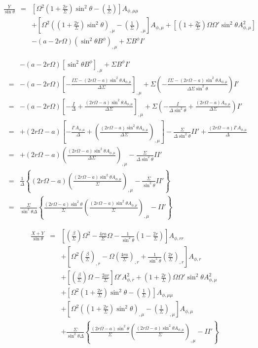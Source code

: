 \documentclass[aps,prd,preprint,groupedaddress]{revtex4-1}
\def\nn{\nonumber}
\def\beqn{\begin{eqnarray}}
\def\eeqn{\end{eqnarray}}
\def\st{\sin\theta}
\def\sst{\sin^2\theta}
\def\Ar{A_{\phi,r}}
\def\Arr{A_{\phi,rr}}
\def\Am{A_{\phi,\mu}}
\def\Amm{A_{\phi,\mu\mu}}
\begin{document}
\beqn
\frac{Y}{\st}
&=&
\left[\Omega^2\left(1+\frac{2r}{\Sigma}\right)\sst-\left(\frac{1}{\Sigma}\right) \right]\Amm\nn\\
&&
+\left[ \Omega^2\left( (1+\frac{2r}{\Sigma})\sst \right)_{,\mu}-\left(\frac{1}{\Sigma}\right)_{,\mu}\right]\Am
+\left[\left(1+\frac{2r}{\Sigma}\right)\Omega\Omega'\sst\Am^2 \right]\nn\\
&&
-(a-2r\Omega)\left(\sst B^\phi \right)_{,\mu}
+ \Sigma B^\phi I'
\eeqn

\beqn
&&
-(a-2r\Omega)\left[\sst B^\phi \right]_{,\mu}
+ \Sigma B^\phi I'\nn\\
&=&
-(a-2r\Omega)\left[-\frac{I\Sigma-(2r\Omega-a)\sst \Am}{\Delta\Sigma} \right]_{,\mu}
+ \Sigma \left(-\frac{I\Sigma-(2r\Omega-a)\sst \Am}{\Delta\Sigma\sin^2\theta}\right) I'
 \nn\\
&=&
- (a-2r\Omega)\left[-\frac{I}{\Delta} + \frac{(2r\Omega-a)\sst \Am}{\Delta\Sigma} \right]_{,\mu}
+ \Sigma\left(-\frac{I}{\Delta\sst}+\frac{(2r\Omega-a) \Am}{\Delta\Sigma}\right) I'\nn\\
&=&
+ (2r\Omega-a)\left[-\frac{I'\Am}{\Delta} + \left(\frac{(2r\Omega-a)\sst \Am}{\Delta\Sigma}\right)_{,\mu} \right]
-\frac{\Sigma}{\Delta\sst} II' +\frac{(2r\Omega-a) I' \Am}{\Delta}\nn\\
&=&
+ (2r\Omega-a) \left(\frac{(2r\Omega-a)\sst \Am}{\Delta\Sigma}\right)_{,\mu}
-\frac{\Sigma}{\Delta\sst} II' \nn\\
&=&
\frac{1}{\Delta}\left\{ (2r\Omega-a) \left(\frac{(2r\Omega-a)\sst \Am}{\Sigma}\right)_{,\mu}
-\frac{\Sigma}{\sst} II' \right\}\nn\\
&=&
\frac{\Sigma}{\sst\Delta}\left\{ \frac{(2r\Omega-a)\sst}{\Sigma} \left(\frac{(2r\Omega-a)\sst \Am}{\Sigma}\right)_{,\mu}
-II' \right\}
\eeqn


\beqn
\frac{X+Y}{\st}
&=&
 \left[\left(\frac{\beta}{\Sigma}\right)\Omega^2
-\frac{4ra}{\Sigma}\Omega
- \frac{1}{\sst}\left(1-\frac{2r}{\Sigma}\right)\right] \Arr \nn\\
&&
+ \left[  \Omega^2 \left(\frac{\beta}{\Sigma}\right)_{,r}
-\Omega\left(\frac{4ra}{\Sigma}\right)_{,r}
+\frac{1}{\sst}\left(\frac{2r}{\Sigma}\right)_{,r}\right] \Ar \nn\\
&&
+ \left[ \left(\frac{\beta}{\Sigma}\right) \Omega-\frac{2ar}{\Sigma}\right]\Omega'\Ar^2
+ \left(1+\frac{2r}{\Sigma}\right)\Omega\Omega'\sst\Am^2 \nn\\
&&
+\left[\Omega^2\left(1+\frac{2r}{\Sigma}\right)\sst-\left(\frac{1}{\Sigma}\right) \right]\Amm\nn\\
&&
+\left[ \Omega^2\left( (1+\frac{2r}{\Sigma})\sst \right)_{,\mu}-\left(\frac{1}{\Sigma}\right)_{,\mu}\right]\Am\nn\\
&&
+\frac{\Sigma}{\sst\Delta}\left\{ \frac{(2r\Omega-a)\sst}{\Sigma} \left(\frac{(2r\Omega-a)\sst \Am}{\Sigma}\right)_{,\mu}
-II' \right\}
\eeqn
\end{document}
